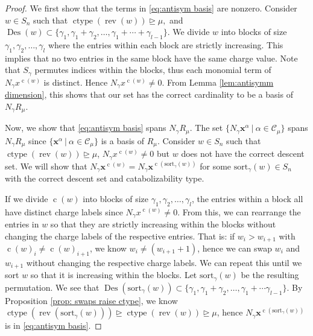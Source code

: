 \documentclass[10pt]{amsart}
\theoremstyle{plain}
\theoremstyle{definition}
\theoremstyle{plain}
\theoremstyle{plain}
\theoremstyle{remark}
\theoremstyle{plain}
\theoremstyle{plain}
\DeclareMathOperator{\ctype}{ctype}
\DeclareMathOperator{\rev}{rev}
\DeclareMathOperator{\cw}{c}
\DeclareMathOperator{\des}{Des}
\begin{document}
\begin{proof}

We first show that the terms in \eqref{eq:antisym basis} are nonzero. 
Consider $w\in S_n$ such that $\ctype(\rev(w)) \unrhd \mu,$ and $\des(w) \subset \{\gamma_1,\gamma_1 + \gamma_2, \dots, \gamma_1 + \cdots + \gamma_{l-1}\}.$ 
We divide $w$ into blocks of size $\gamma_1,\gamma_2,\dots, \gamma_{l}$ where the entries within each block are strictly increasing. 
This implies that no two entries in the same block have the same charge value.
Note that $S_\gamma$ permutes indices within the blocks, thus each monomial term of $N_{\gamma}x^{\cw(w)}$ is distinct. 
Hence $N_{\gamma} x^{\cw(w)} \neq 0$.
From Lemma \ref{lem:antisymm dimension}, this shows that our set has the correct cardinality to be a basis of $N_{\gamma}R_{\mu}$. 

Now, we show that \eqref{eq:antisym basis} spans $N_\gamma R_{\mu}$. The set $\{N_\gamma \mathbf{x}^\alpha \ | \ \alpha \in \mathcal{C}_\mu\}$
spans $N_\gamma R_{\mu}$ since $\{\mathbf{x}^\alpha \ | \ \alpha \in \mathcal{C}_\mu\}$ is a basis of $R_{\mu}$.
Consider $w\in S_n$ such that $\ctype(\rev(w))\unrhd\mu$, $N_\gamma x^{\cw(w)} \neq 0$ but $w$ does not have the correct descent set. We will show that $N_\gamma\mathbf{x}^{\cw(w)} = N_\gamma\mathbf{x}^{\cw(\text{sort}_\gamma (w))}$  for some $\text{sort}_\gamma(w)\in S_n$ with the correct descent set and catabolizability type.

If we divide $\cw(w)$ into blocks of size $\gamma_1,\gamma_2,\dots, \gamma_{l}$, the entries within a block all have distinct charge labels since $N_\gamma x^{\cw(w)} \neq 0$. 
From this, we can rearrange the entries in $w$ so that they are strictly increasing within the blocks without changing the charge labels of the respective entries. That is: if $w_i > w_{i+1}$ with $\cw(w)_i \neq \cw(w)_{i+1}$, we know $w_i \neq (w_{i+1} + 1)$, hence we can swap $w_i$ and $w_{i+1}$ without changing the respective charge labels.
We can repeat this until we sort $w$ so that it is increasing within the blocks. Let $\text{sort}_\gamma(w)$ be the resulting permutation.
We see that $\des(\text{sort}_\gamma(w) )\subset \{\gamma_1,\gamma_1+\gamma_2,\dots, \gamma_1+ \cdots \gamma_{l-1}\}.$ 
 By Proposition \ref{prop: swaps raise ctype}, we know $\ctype(\rev(\text{sort}_\gamma(w))) \unrhd \ctype(\rev(w)) \unrhd \mu$, hence $N_\gamma \mathbf{x}^{\cw(\text{sort}_\gamma(w))}$ is in  \eqref{eq:antisym basis}.
\end{proof}
\end{document}

